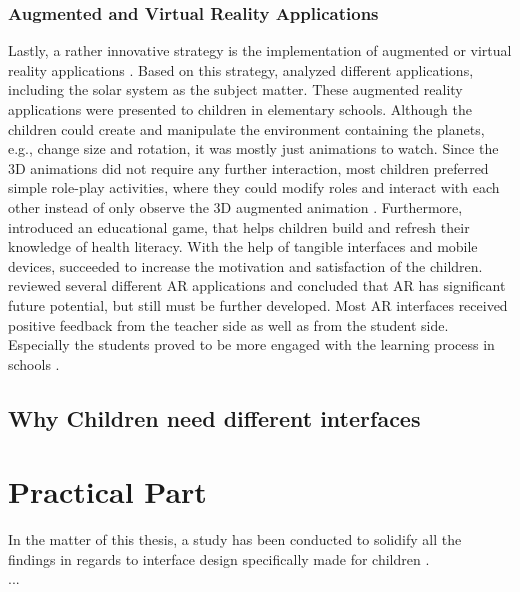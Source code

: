 \subsubsection{Augmented and Virtual Reality Applications}
Lastly, a rather innovative strategy is the implementation of augmented or virtual reality applications \autocite{saidin2015review, lozano2016dedigitalizing}. Based on this strategy, \textcite{kerawalla2006making}  analyzed different applications, including the solar system as the subject matter. These augmented reality applications were presented to children in elementary schools.
Although the children could create and manipulate the environment containing the planets, e.g., change size and rotation, it was mostly just animations to watch. Since the 3D animations did not require any further interaction, most children preferred simple role-play activities, where they could modify roles and interact with each other instead of only observe the 3D augmented animation \autocite{kerawalla2006making}.
Furthermore, \textcite{lozano2016dedigitalizing} introduced an educational game, that helps children build and refresh their knowledge of health literacy. With the help of tangible interfaces and mobile devices, \textcite{lozano2016dedigitalizing} succeeded to increase the motivation and satisfaction of the children. 
\textcite{saidin2015review} reviewed several different AR applications and concluded that AR has significant future potential, but still must be further developed. Most AR interfaces received positive feedback from the teacher side as well as from the student side. Especially the students proved to be more engaged with the learning process in schools \autocite{saidin2015review}.

\subsection{Why Children need different interfaces}
\label{subsection:ChildrenInterfaces}



\section{Practical Part}
\label{section:PracticalPart}
In the matter of this thesis, a study has been conducted to solidify all the findings in regards to interface design specifically made for children \autocite{gossen2012search, engen2014ipads, lozano2016dedigitalizing}. 
\\...\\

